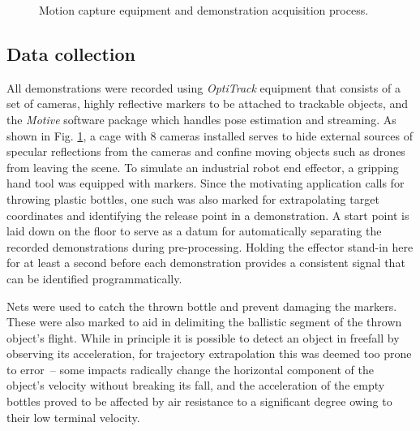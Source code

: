 \documentclass{article}
\begin{document}
\begin{figure}
	\centering
	\caption{Motion capture equipment and demonstration acquisition process. }
	\label{fig:fig1}
\end{figure}

\subsection{Data collection}
\label{sec:collection}


All demonstrations were recorded using \emph{OptiTrack} equipment that consists of a set of cameras, highly reflective markers to be attached to trackable objects, and the \emph{Motive} software package which handles pose estimation and streaming. As shown in Fig. \ref{fig:fig1}, a cage with 8 cameras installed serves to hide external sources of specular reflections from the cameras and confine moving objects such as drones from leaving the scene. To simulate an industrial robot end effector, a gripping hand tool was equipped with markers. Since the motivating application calls for throwing plastic bottles, one such was also marked for extrapolating target coordinates and identifying the release point in a demonstration. A start point is laid down on the floor to serve as a datum for automatically separating the recorded demonstrations during pre-processing. Holding the effector stand-in here for at least a second before each demonstration provides a consistent signal that can be identified programmatically.

Nets were used to catch the thrown bottle and prevent damaging the markers. These were also marked to aid in delimiting the ballistic segment of the thrown object's flight. While in principle it is possible to detect an object in freefall by observing its acceleration, for trajectory extrapolation this was deemed too prone to error~-- some impacts radically change the horizontal component of the object's velocity without breaking its fall, and the acceleration of the empty bottles proved to be affected by air resistance to a significant degree owing to their low terminal velocity.
\end{document}
